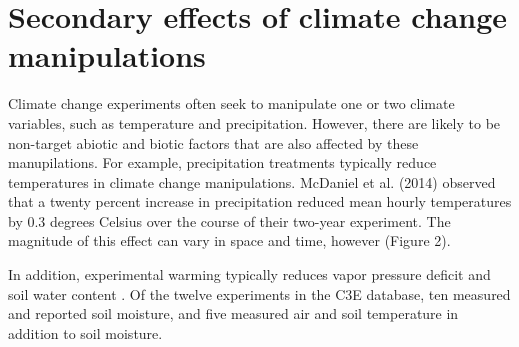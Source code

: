 \documentclass{article}
\begin{document}
\section* {Secondary effects of climate change manipulations}
Climate change experiments often seek to manipulate one or two climate variables, such as temperature and precipitation. However, there are likely to be non-target abiotic and biotic factors that are also affected by these manupilations. For example, precipitation treatments typically reduce temperatures in climate change manipulations\citep{sherry2007,rollinson2012,mcdaniel2014}. McDaniel et al. (2014) observed that a twenty percent increase in precipitation reduced mean hourly temperatures by 0.3 degrees Celsius over the course of their two-year experiment. The magnitude of this effect can vary in space and time, however (Figure 2). 
\par In addition, experimental warming typically reduces vapor pressure deficit and soil water content \citep[e.g. Figure 3S][]{sherry2007,morin2010,templer2016}. Of the twelve experiments in the C3E database, ten measured and reported soil moisture, and five measured air and soil temperature in addition to soil moisture. %
\end{document}
